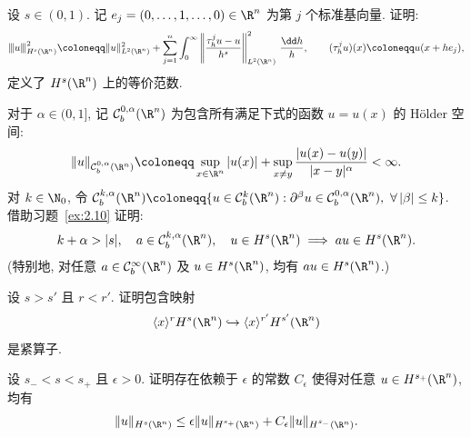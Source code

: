 \begin{exer}\label{ex:2.10}
设 $s \in (0, 1)$. 记 $e_j = (0, \ldots, 1, \ldots, 0) \in \R^n$ 为第 $j$ 个标准基向量. 证明:
\begin{equation}\label{eq:2.75}
    {\left\vert\kern-0.25ex\left\vert\kern-0.25ex\left\vert u \right\vert\kern-0.25ex\right\vert\kern-0.25ex\right\vert}_{H^s(\R^n)}^2 \defeq \|u\|_{L^2(\R^n)}^2 + \sum_{j=1}^n \int_0^\infty \left\| \frac{\tau_h^j u - u}{h^s} \right\|_{L^2(\R^n)}^2 \,\frac{\dd h}{h}, \qquad (\tau_h^j u)(x) \defeq u(x + h e_j),
\end{equation}
定义了 $H^s(\R^n)$ 上的等价范数.
\end{exer}

\begin{exer}\label{ex:2.11}
对于 $\alpha \in (0, 1]$, 记 $\mathcal{C}_b^{0, \alpha}(\R^n)$ 为包含所有满足下式的函数 $u = u(x)$ 的 Hölder 空间:
\begin{equation}\label{eq:2.76}
    \|u\|_{\mathcal{C}_b^{0, \alpha}(\R^n)} \defeq \sup_{x \in \R^n} |u(x)| + \sup_{x \neq y} \frac{|u(x) - u(y)|}{|x - y|^\alpha} < \infty.
\end{equation}
对 $k \in \N_0$, 令 $\mathcal{C}_b^{k, \alpha}(\R^n) \defeq \{u \in \mathcal{C}_b^k(\R^n) : \partial^\beta u \in \mathcal{C}_b^{0, \alpha}(\R^n), \ \forall\,|\beta| \le k\}$. 借助习题~\ref{ex:2.10} 证明:
\begin{equation}\label{eq:2.77}
    k + \alpha > |s|, \quad a \in \mathcal{C}_b^{k, \alpha}(\R^n), \quad u \in H^s(\R^n) \implies a u \in H^s(\R^n).
\end{equation}
(特别地, 对任意 $a \in \mathcal{C}_b^\infty(\R^n)$ 及 $u \in H^s(\R^n)$, 均有 $a u \in H^s(\R^n)$.)
\end{exer}

\begin{exer}\label{ex:2.12}
设 $s > s'$ 且 $r < r'$. 证明包含映射
\[
    \langle x \rangle^r H^s(\R^n) \hookrightarrow \langle x \rangle^{r'} H^{s'}(\R^n)
\]
是紧算子.
\end{exer}

\begin{exer}\label{ex:2.13}
设 $s_- < s < s_+$ 且 $\epsilon > 0$. 证明存在依赖于 $\epsilon$ 的常数 $C_\epsilon$ 使得对任意 $u \in H^{s_+}(\R^n)$, 均有
\begin{equation}\label{eq:2.78}
    \|u\|_{H^s(\R^n)} \le \epsilon \|u\|_{H^{s_+}(\R^n)} + C_\epsilon \|u\|_{H^{s_-}(\R^n)}.
\end{equation}
\end{exer}

